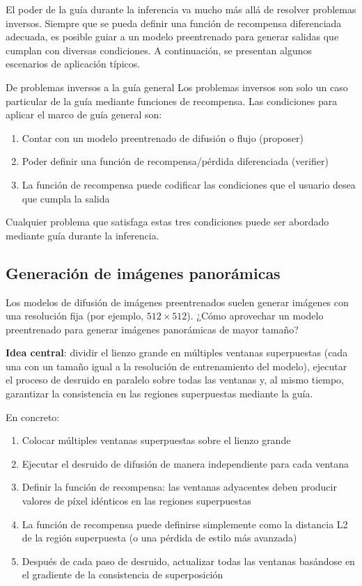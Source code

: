 \documentclass[a4paper]{article}
\begin{document}
El poder de la guía durante la inferencia va mucho más allá de resolver problemas inversos. Siempre que se pueda definir una función de recompensa diferenciada adecuada, es posible guiar a un modelo preentrenado para generar salidas que cumplan con diversas condiciones. A continuación, se presentan algunos escenarios de aplicación típicos.

\begin{knowledgebox}{De problemas inversos a la guía general}
Los problemas inversos son solo un caso particular de la guía mediante funciones de recompensa. Las condiciones para aplicar el marco de guía general son:
\begin{enumerate}
    \item Contar con un modelo preentrenado de difusión o flujo (proposer)
    \item Poder definir una función de recompensa/pérdida diferenciada (verifier)
    \item La función de recompensa puede codificar las condiciones que el usuario desea que cumpla la salida
\end{enumerate}
Cualquier problema que satisfaga estas tres condiciones puede ser abordado mediante guía durante la inferencia.
\end{knowledgebox}

\subsection{Generación de imágenes panorámicas}

Los modelos de difusión de imágenes preentrenados suelen generar imágenes con una resolución fija (por ejemplo, $512 \times 512$). ¿Cómo aprovechar un modelo preentrenado para generar imágenes panorámicas de mayor tamaño?

\textbf{Idea central}: dividir el lienzo grande en múltiples ventanas superpuestas (cada una con un tamaño igual a la resolución de entrenamiento del modelo), ejecutar el proceso de desruido en paralelo sobre todas las ventanas y, al mismo tiempo, garantizar la consistencia en las regiones superpuestas mediante la guía.

En concreto:
\begin{enumerate}
    \item Colocar múltiples ventanas superpuestas sobre el lienzo grande
    \item Ejecutar el desruido de difusión de manera independiente para cada ventana
    \item Definir la función de recompensa: las ventanas adyacentes deben producir valores de píxel idénticos en las regiones superpuestas
    \item La función de recompensa puede definirse simplemente como la distancia L2 de la región superpuesta (o una pérdida de estilo más avanzada)
    \item Después de cada paso de desruido, actualizar todas las ventanas basándose en el gradiente de la consistencia de superposición
\end{enumerate}
\end{document}

